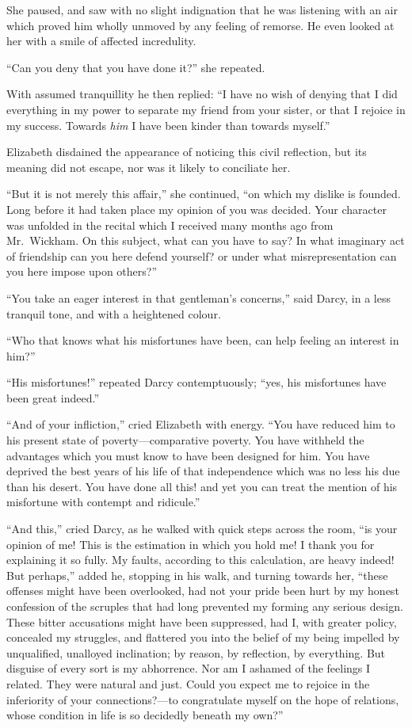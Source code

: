 She paused, and saw with no slight indignation that he was
listening with an air which proved him wholly unmoved by any
feeling of remorse.  He even looked at her with a smile of
affected incredulity.

``Can you deny that you have done it?'' she repeated.

With assumed tranquillity he then replied: ``I have no wish of
denying that I did everything in my power to separate my friend
from your sister, or that I rejoice in my success.  Towards \emph{him}
I have been kinder than towards myself.''

Elizabeth disdained the appearance of noticing this civil
reflection, but its meaning did not escape, nor was it likely to
conciliate her.

``But it is not merely this affair,'' she continued, ``on which my
dislike is founded.  Long before it had taken place my opinion
of you was decided.  Your character was unfolded in the recital
which I received many months ago from Mr.\ Wickham.  On this
subject, what can you have to say?  In what imaginary act
of friendship can you here defend yourself?  or under what
misrepresentation can you here impose upon others?''

``You take an eager interest in that gentleman's concerns,'' said
Darcy, in a less tranquil tone, and with a heightened colour.

``Who that knows what his misfortunes have been, can help
feeling an interest in him?''

``His misfortunes!'' repeated Darcy contemptuously; ``yes, his
misfortunes have been great indeed.''

``And of your infliction,'' cried Elizabeth with energy.  ``You
have reduced him to his present state of poverty---comparative
poverty.  You have withheld the advantages which you must
know to have been designed for him.  You have deprived the
best years of his life of that independence which was no less his
due than his desert.  You have done all this!  and yet you can
treat the mention of his misfortune with contempt and ridicule.''

``And this,'' cried Darcy, as he walked with quick steps across
the room, ``is your opinion of me!  This is the estimation in
which you hold me!  I thank you for explaining it so fully.  My
faults, according to this calculation, are heavy indeed!  But
perhaps,'' added he, stopping in his walk, and turning towards
her, ``these offenses might have been overlooked, had not your
pride been hurt by my honest confession of the scruples that had
long prevented my forming any serious design.  These bitter
accusations might have been suppressed, had I, with greater
policy, concealed my struggles, and flattered you into the belief
of my being impelled by unqualified, unalloyed inclination; by
reason, by reflection, by everything.  But disguise of every sort
is my abhorrence.  Nor am I ashamed of the feelings I related.
They were natural and just.  Could you expect me to rejoice in
the inferiority of your connections?---to congratulate myself on
the hope of relations, whose condition in life is so decidedly
beneath my own?''

